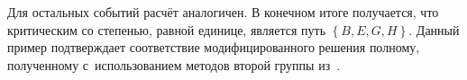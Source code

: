 Для остальных событий расчёт аналогичен. В конечном итоге получается, что критическим со степенью, равной единице, является путь $\left\{B, E, G, H \right\}$. Данный пример подтверждает соответствие модифицированного решения полному, полученному с~использованием методов второй группы из~\cite{Leondes, Dubois_Prade, McCahon_Lee}.